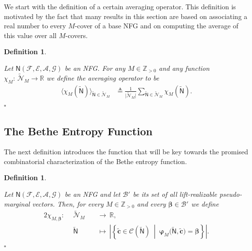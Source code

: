 \documentclass[journal, twocolumn]{IEEEtran}
\renewcommand{\mathbf}[1]{{\bm{#1}}}
\newcommand{\R}{\mathbb{R}}
\newcommand{\Z}{\mathbb{Z}}
\newcommand{\Zpp}{\Z_{>0}}
\newcommand{\vect}[1]{\mathbf{#1}}
\newcommand{\code}[1]{\mathcal{#1}}
\newcommand{\set}[1]{\mathcal{#1}}
\newcommand{\graph}[1]{\mathsf{#1}}
\newcommand{\defeq}{\triangleq}
\newcommand{\codeCedge}{\code{C}}
\newcommand{\bel}{\beta}
\newcommand{\vbel}{\boldsymbol{\bel}}
\newcommand{\setA}{\set{A}}
\newcommand{\setE}{\set{E}}
\newcommand{\setF}{\set{F}}
\newcommand{\setG}{\set{G}}
\newcommand{\cvc}{\vect{\cover{c}}}
\newcommand{\lmpBdown}[1]{\mathcal{B}'_{#1}}
\newcommand{\graphN}{\graph{N}}
\newcommand{\cover}[1]{\tilde{#1}}
\newcommand{\cset}[1]{\cover{\set{#1}}}
\newcommand{\cgraph}[1]{\cover{\graph{#1}}}
\newcommand{\card}[1]{\left\lvert #1 \right\rvert}
\newcommand{\cardbig}[1]{\big\lvert #1 \big\rvert}
\newcommand{\?}{\mathrm{?}}
\newcommand{\varphiM}{\boldsymbol{\varphi}_{M}}
\newcommand{\qedwhite}{\hspace*{\fill}%
  $\square$\smallskip}
\newcommand{\defend}{\qedwhite}
\newtheorem{Definition}[Lemma]{Definition}
\begin{document}
We start with the definition of a certain averaging operator. This definition
is motivated by the fact that many results in this section are based on
associating a real number to every $M$-cover of a base NFG and on computing
the average of this value over all $M$-covers.


\begin{Definition}
  \label{def:average:over:graph:covers:1}

  Let $\graphN(\setF,\setE, \setA, \setG)$ be an NFG. For any
  $M \in \Zpp$ and any function $\chi_M: \, \cset{N}_M \to \R$ we define the
  averaging operator to be
  \begin{align*}
    \Big\langle \!
      \chi_M(\cgraph{N})
    \! \Big\rangle_{\cgraph{N} \in \cset{N}_M}
      &\defeq
         \frac{1}{\cardbig{\cset{N}_M}}
         \sum_{\cgraph{N} \in \cset{N}_M}
           \chi_M(\cgraph{N}).
  \end{align*}
  \vskip-0.25cm
  \defend
\end{Definition}




\subsection{The Bethe Entropy Function}


The next definition introduces the function that will be key towards the
promised combinatorial characterization of the Bethe entropy function.


\begin{Definition}
  \label{def:counting:valid:configurations:compatible:with:beliefs:1}

  Let $\graphN(\setF,\setE, \setA, \setG)$ be an NFG and let $\lmpBdown{}$ be its
  set of all lift-realizable pseudo-marginal vectors. Then, for every $M \in
  \Zpp$ and every $\vbel \in \lmpBdown{}$ we define
  \begin{alignat}{2}
    \chi_{M,\vbel}: \ \ 
      &\cset{N}_M
       &&\ \to \ 
         \R, \nonumber \\
      &\cgraph{N}
       &&\ \mapsto \ 
         \card{
           \left\{
             \cvc \in \codeCedge(\cgraph{N})
           \ \middle| \ 
             \varphiM\big( \cgraph{N},\cvc \big) = \vbel
         \right\}}.
           \label{eq:average:number:of:valid:configurations:1}
  \end{alignat}
  \defend
\end{Definition}
\end{document}
